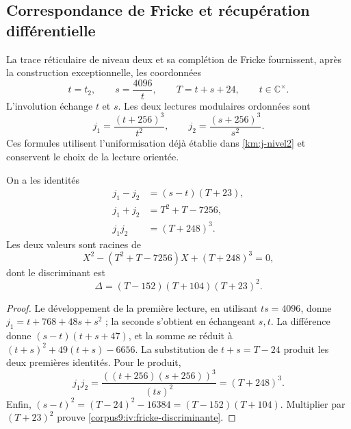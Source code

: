 \subsection{Correspondance de Fricke et récupération différentielle}
\label{corpus9:iv:fricke}

La trace réticulaire de niveau deux et sa complétion de Fricke
fournissent, après la construction exceptionnelle, les
coordonnées
\[
 t=t_2,\qquad s=\frac{4096}{t},\qquad
 T=t+s+24,\qquad t\in\mathbb C^\times.
\]
L’involution échange \(t\) et \(s\). Les deux lectures modulaires
ordonnées sont
\[
 j_1=\frac{(t+256)^3}{t^2},\qquad
 j_2=\frac{(s+256)^3}{s^2}.
\]
Ces formules utilisent l’uniformisation déjà établie dans
\eqref{km:j-nivel2} et conservent le choix de la lecture orientée.

\begin{proposition}
\label{corpus9:iv:fricke-correspondencia}
On a les identités
\begin{align}
 j_1-j_2&=(s-t)(T+23),\\
 j_1+j_2&=T^2+T-7256,\\
 j_1j_2&=(T+248)^3.
 \label{corpus9:iv:fricke-simetricos}
\end{align}
Les deux valeurs sont racines de
\[
 X^2-(T^2+T-7256)X+(T+248)^3=0,
\]
dont le discriminant est
\begin{equation}
 \Delta=(T-152)(T+104)(T+23)^2.
 \label{corpus9:iv:fricke-discriminante}
\end{equation}
\end{proposition}
\begin{proof}
Le développement de la première lecture, en utilisant \(ts=4096\), donne
\(j_1=t+768+48s+s^2\) ; la seconde s’obtient en échangeant
\(s,t\). La différence donne \((s-t)(t+s+47)\), et la somme se réduit à
\((t+s)^2+49(t+s)-6656\). La substitution de \(t+s=T-24\) produit
les deux premières identités. Pour le produit,
\[
 j_1j_2
 =\frac{((t+256)(s+256))^3}{(ts)^2}
 =(T+248)^3.
\]
Enfin,
\((s-t)^2=(T-24)^2-16384=(T-152)(T+104)\).
Multiplier par \((T+23)^2\) prouve
\eqref{corpus9:iv:fricke-discriminante}.
\end{proof}

